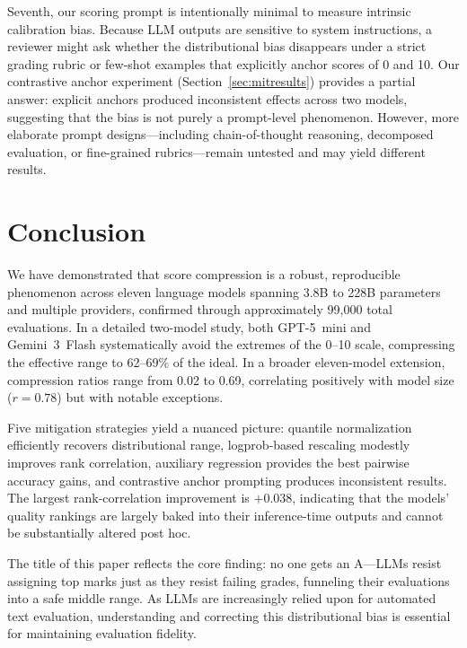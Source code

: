 \documentclass[11pt]{article}
\begin{document}
Seventh, our scoring prompt is intentionally minimal to measure intrinsic calibration bias. Because LLM outputs are sensitive to system instructions, a reviewer might ask whether the distributional bias disappears under a strict grading rubric or few-shot examples that explicitly anchor scores of 0 and 10. Our contrastive anchor experiment (Section~\ref{sec:mitresults}) provides a partial answer: explicit anchors produced inconsistent effects across two models, suggesting that the bias is not purely a prompt-level phenomenon. However, more elaborate prompt designs---including chain-of-thought reasoning, decomposed evaluation, or fine-grained rubrics---remain untested and may yield different results.

\section{Conclusion}
\label{sec:conclusion}

We have demonstrated that score compression is a robust, reproducible phenomenon across eleven language models spanning 3.8B to 228B parameters and multiple providers, confirmed through approximately 99{,}000 total evaluations. In a detailed two-model study, both GPT-5~mini and Gemini~3~Flash systematically avoid the extremes of the 0--10 scale, compressing the effective range to 62--69\% of the ideal. In a broader eleven-model extension, compression ratios range from 0.02 to 0.69, correlating positively with model size ($r = 0.78$) but with notable exceptions.

Five mitigation strategies yield a nuanced picture: quantile normalization efficiently recovers distributional range, logprob-based rescaling modestly improves rank correlation, auxiliary regression provides the best pairwise accuracy gains, and contrastive anchor prompting produces inconsistent results. The largest rank-correlation improvement is $+0.038$, indicating that the models' quality rankings are largely baked into their inference-time outputs and cannot be substantially altered post hoc.

The title of this paper reflects the core finding: no one gets an A---LLMs resist assigning top marks just as they resist failing grades, funneling their evaluations into a safe middle range. As LLMs are increasingly relied upon for automated text evaluation, understanding and correcting this distributional bias is essential for maintaining evaluation fidelity.
\end{document}
